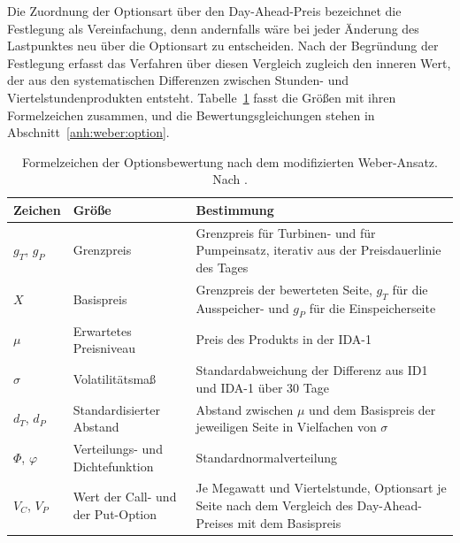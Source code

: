 Die Zuordnung der Optionsart über den Day-Ahead-Preis bezeichnet die Festlegung als Vereinfachung, denn andernfalls wäre bei jeder Änderung des Lastpunktes neu über die Optionsart zu entscheiden.
Nach der Begründung der Festlegung erfasst das Verfahren über diesen Vergleich zugleich den inneren Wert, der aus den systematischen Differenzen zwischen Stunden- und Viertelstundenprodukten entsteht.
Tabelle~\ref{tab:weber_symbole} fasst die Größen mit ihren Formelzeichen zusammen, und die Bewertungsgleichungen stehen in Abschnitt~\ref{anh:weber:option}.

\begin{table}[htbp]
    \centering
    \caption{Formelzeichen der Optionsbewertung nach dem modifizierten Weber-Ansatz. Nach \cite{bundesnetzagentur_anlage1_2024}.}
    \label{tab:weber_symbole}
    \small
    \begin{tabular}{@{}>{\raggedright\arraybackslash}p{}>{\raggedright\arraybackslash}p{}>{\raggedright\arraybackslash}p{}@{}}
        \hline
        \textbf{Zeichen} & \textbf{Größe} & \textbf{Bestimmung} \\
        \hline
        $g_T$, $g_P$ & Grenzpreis & Grenzpreis für Turbinen- und für Pumpeinsatz, iterativ aus der Preisdauerlinie des Tages \\
        \hline
        $X$ & Basispreis & Grenzpreis der bewerteten Seite, $g_T$ für die Ausspeicher- und $g_P$ für die Einspeicherseite \\
        \hline
        $\mu$ & Erwartetes Preisniveau & Preis des Produkts in der \acs{IDA-1} \\
        \hline
        $\sigma$ & Volatilitätsmaß & Standardabweichung der Differenz aus \acs{ID1} und \acs{IDA-1} über 30 Tage \\
        \hline
        $d_T$, $d_P$ & Standardisierter Abstand & Abstand zwischen $\mu$ und dem Basispreis der jeweiligen Seite in Vielfachen von $\sigma$ \\
        \hline
        $\Phi$, $\varphi$ & Verteilungs- und Dichtefunktion & Standardnormalverteilung \\
        \hline
        $V_C$, $V_P$ & Wert der Call- und der Put-Option & Je Megawatt und Viertelstunde, Optionsart je Seite nach dem Vergleich des Day-Ahead-Preises mit dem Basispreis \\
        \hline
    \end{tabular}
\end{table}

